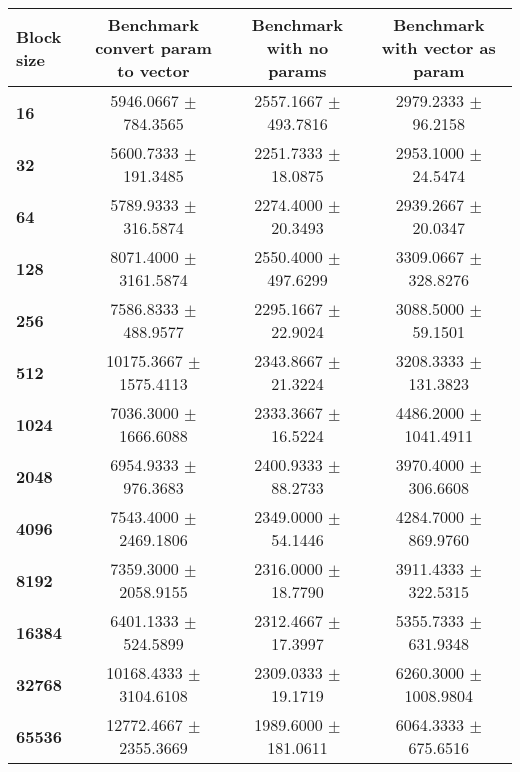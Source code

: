 \begin{tabular}{|l|c|c|c|}\hline
\textbf{Block size}  & \textbf{Benchmark convert param to vector} & \textbf{Benchmark with no params} & \textbf{Benchmark with vector as param}\\\hline
\textbf{16}  & 5946.0667 $\pm$ 784.3565 & 2557.1667 $\pm$ 493.7816 & 2979.2333 $\pm$ 96.2158\\\hline
\textbf{32}  & 5600.7333 $\pm$ 191.3485 & 2251.7333 $\pm$ 18.0875 & 2953.1000 $\pm$ 24.5474\\\hline
\textbf{64}  & 5789.9333 $\pm$ 316.5874 & 2274.4000 $\pm$ 20.3493 & 2939.2667 $\pm$ 20.0347\\\hline
\textbf{128}  & 8071.4000 $\pm$ 3161.5874 & 2550.4000 $\pm$ 497.6299 & 3309.0667 $\pm$ 328.8276\\\hline
\textbf{256}  & 7586.8333 $\pm$ 488.9577 & 2295.1667 $\pm$ 22.9024 & 3088.5000 $\pm$ 59.1501\\\hline
\textbf{512}  & 10175.3667 $\pm$ 1575.4113 & 2343.8667 $\pm$ 21.3224 & 3208.3333 $\pm$ 131.3823\\\hline
\textbf{1024}  & 7036.3000 $\pm$ 1666.6088 & 2333.3667 $\pm$ 16.5224 & 4486.2000 $\pm$ 1041.4911\\\hline
\textbf{2048}  & 6954.9333 $\pm$ 976.3683 & 2400.9333 $\pm$ 88.2733 & 3970.4000 $\pm$ 306.6608\\\hline
\textbf{4096}  & 7543.4000 $\pm$ 2469.1806 & 2349.0000 $\pm$ 54.1446 & 4284.7000 $\pm$ 869.9760\\\hline
\textbf{8192}  & 7359.3000 $\pm$ 2058.9155 & 2316.0000 $\pm$ 18.7790 & 3911.4333 $\pm$ 322.5315\\\hline
\textbf{16384}  & 6401.1333 $\pm$ 524.5899 & 2312.4667 $\pm$ 17.3997 & 5355.7333 $\pm$ 631.9348\\\hline
\textbf{32768}  & 10168.4333 $\pm$ 3104.6108 & 2309.0333 $\pm$ 19.1719 & 6260.3000 $\pm$ 1008.9804\\\hline
\textbf{65536} & 12772.4667 $\pm$ 2355.3669 & 1989.6000 $\pm$ 181.0611 & 6064.3333 $\pm$ 675.6516\\\hline
\end{tabular}
